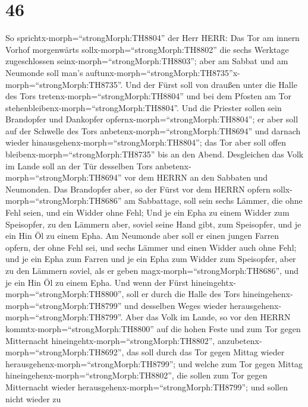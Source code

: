 \hypertarget{section-45}{%
\section{46}\label{section-45}}

 So sprichtx-morph=``strongMorph:TH8804'' der Herr HERR: Das
Tor am innern Vorhof morgenwärts sollx-morph=``strongMorph:TH8802'' die
sechs Werktage zugeschlossen seinx-morph=``strongMorph:TH8803''; aber am
Sabbat und am Neumonde soll man's
auftunx-morph=``strongMorph:TH8735''x-morph=``strongMorph:TH8735''.
 Und der Fürst soll von draußen unter die Halle des Tors
tretenx-morph=``strongMorph:TH8804'' und bei dem Pfosten am Tor
stehenbleibenx-morph=``strongMorph:TH8804''. Und die Priester sollen
sein Brandopfer und Dankopfer opfernx-morph=``strongMorph:TH8804''; er
aber soll auf der Schwelle des Tors
anbetenx-morph=``strongMorph:TH8694'' und darnach wieder
hinausgehenx-morph=``strongMorph:TH8804''; das Tor aber soll offen
bleibenx-morph=``strongMorph:TH8735'' bis an den Abend. 
Desgleichen das Volk im Lande soll an der Tür desselben Tors
anbetenx-morph=``strongMorph:TH8694'' vor dem HERRN an den Sabbaten und
Neumonden.  Das Brandopfer aber, so der Fürst vor dem HERRN
opfern sollx-morph=``strongMorph:TH8686'' am Sabbattage, soll sein sechs
Lämmer, die ohne Fehl seien, und ein Widder ohne Fehl;  Und
je ein Epha zu einem Widder zum Speisopfer, zu den Lämmern aber, soviel
seine Hand gibt, zum Speisopfer, und je ein Hin Öl zu einem Epha.
 Am Neumonde aber soll er einen jungen Farren opfern, der
ohne Fehl sei, und sechs Lämmer und einen Widder auch ohne Fehl;
 und je ein Epha zum Farren und je ein Epha zum Widder zum
Speisopfer, aber zu den Lämmern soviel, als er geben
magx-morph=``strongMorph:TH8686'', und je ein Hin Öl zu einem Epha.
 Und wenn der Fürst
hineingehtx-morph=``strongMorph:TH8800'', soll er durch die Halle des
Tors hineingehenx-morph=``strongMorph:TH8799'' und desselben Weges
wieder herausgehenx-morph=``strongMorph:TH8799''.  Aber das
Volk im Lande, so vor den HERRN kommtx-morph=``strongMorph:TH8800'' auf
die hohen Feste und zum Tor gegen Mitternacht
hineingehtx-morph=``strongMorph:TH8802'',
anzubetenx-morph=``strongMorph:TH8692'', das soll durch das Tor gegen
Mittag wieder herausgehenx-morph=``strongMorph:TH8799''; und welche zum
Tor gegen Mittag hineingehenx-morph=``strongMorph:TH8802'', die sollen
zum Tor gegen Mitternacht wieder
herausgehenx-morph=``strongMorph:TH8799''; und sollen nicht wieder zu
